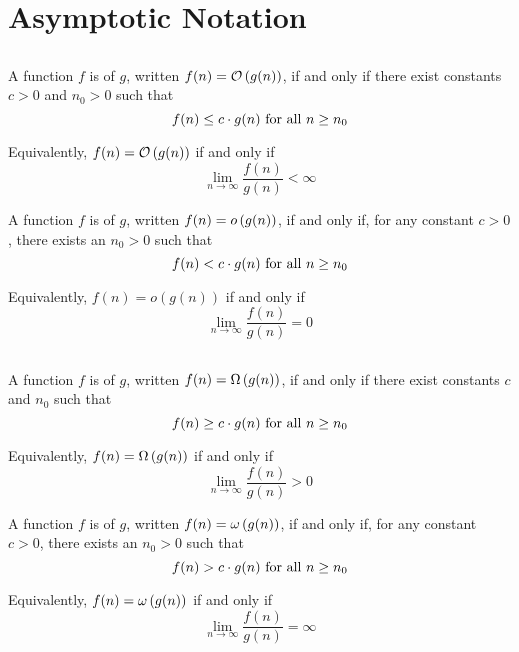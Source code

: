 
\section{Asymptotic Notation}
\subsection{\texorpdfstring{\bigOName}{Big-O}}
\begin{definition}{\bigOName}{}
    A function $f$ is \bigOName of $g$, written $f(n)=\mathcal{O}\left(g(n)\right)$, if and only if there exist constants $c>0$ and $n_0>0$ such that \[f(n)\leq c\cdot g(n)\hbox{ for all $n\geq n_0$}\]

    Equivalently, $f(n)=\mathcal{O}\left(g(n)\right)$ if and only if \[\lim_{n\to\infty}\frac{f(n)}{g(n)}<\infty\]
\end{definition}

\begin{definition}{\littleOName}{}
    A function $f$ is \littleOName of $g$, written $f(n)=o\left(g(n)\right)$, if and only if, for any constant $c>0$, there exists an $n_0>0$ such that \[f(n)< c\cdot g(n)\hbox{ for all $n\geq n_0$}\]

    Equivalently, $f(n)=o(g(n))$ if and only if \[\lim_{n\to\infty}\frac{f(n)}{g(n)}=0\]
\end{definition}

\subsection{\texorpdfstring{\bigOmName}{Big-Ω}}
\begin{definition}{\bigOmName}{}
    A function $f$ is \bigOmName of $g$, written $f(n)=\Omega\left(g(n)\right)$, if and only if there exist constants $c$ and $n_0$ such that \[f(n)\geq c\cdot g(n)\hbox{ for all $n\geq n_0$}\]

    Equivalently, $f(n)=\Omega\left(g(n)\right)$ if and only if \[\lim_{n\to\infty}\frac{f(n)}{g(n)}>0\]
\end{definition}

\begin{definition}{\littleOmName}{}
    A function $f$ is \littleOmName of $g$, written $f(n)=\omega\left(g(n)\right)$, if and only if, for any constant $c>0$, there exists an $n_0>0$ such that \[f(n)> c\cdot g(n)\hbox{ for all $n\geq n_0$}\]

    Equivalently, $f(n)=\omega\left(g(n)\right)$ if and only if \[\lim_{n\to\infty}\frac{f(n)}{g(n)}=\infty\]
\end{definition}

